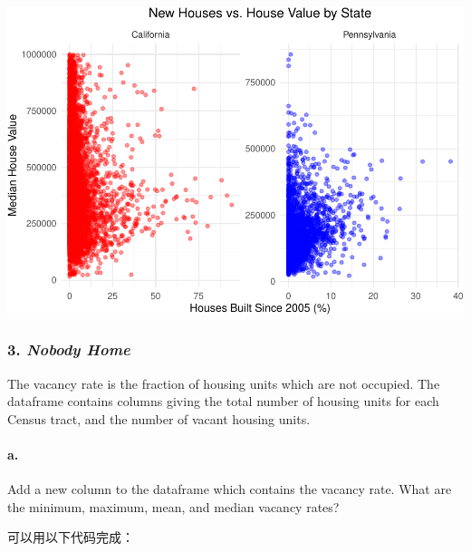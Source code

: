 \documentclass[
]{article}
\newenvironment{Shaded}{\begin{snugshade}}{\end{snugshade}}
\newcommand{\AttributeTok}[1]{\textcolor[rgb]{0.13,0.29,0.53}{#1}}
\newcommand{\FunctionTok}[1]{\textcolor[rgb]{0.13,0.29,0.53}{\textbf{#1}}}
\newcommand{\NormalTok}[1]{#1}
\newcommand{\OtherTok}[1]{\textcolor[rgb]{0.56,0.35,0.01}{#1}}
\newcommand{\SpecialCharTok}[1]{\textcolor[rgb]{0.81,0.36,0.00}{\textbf{#1}}}
\begin{document}
\includegraphics{Homework-02_files/figure-latex/unnamed-chunk-7-1.pdf}

\subsubsection{\texorpdfstring{3. \emph{Nobody
Home}}{3. Nobody Home}}\label{nobody-home}

The vacancy rate is the fraction of housing units which are not
occupied. The dataframe contains columns giving the total number of
housing units for each Census tract, and the number of vacant housing
units.

\paragraph{a.}\label{a.-2}

Add a new column to the dataframe which contains the vacancy rate. What
are the minimum, maximum, mean, and median vacancy rates?

可以用以下代码完成：

\begin{Shaded}
\end{Shaded}
\end{document}
